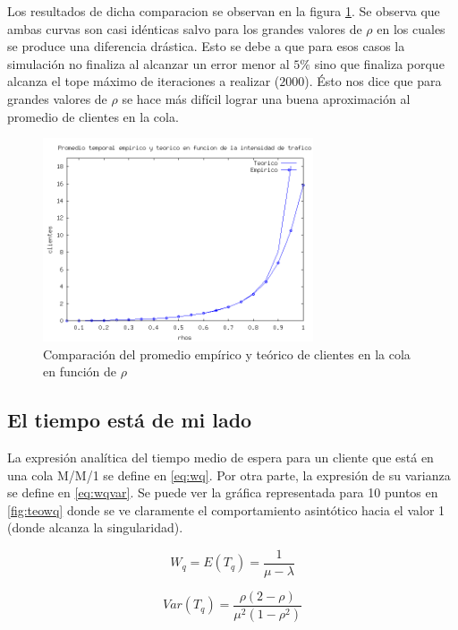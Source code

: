 \documentclass{sig-alternate}
\begin{document}
Los resultados de dicha comparacion se observan en la figura \ref{fig:meanQueueVS}. Se observa que ambas curvas
son casi id\'enticas salvo para los grandes valores de $\rho$ en los cuales se produce una diferencia dr\'astica.
Esto se debe a que para esos casos la simulaci\'on no finaliza al alcanzar un error menor al $5\%$ sino que finaliza
porque alcanza el tope m\'aximo de iteraciones a realizar ($2000$). \'Esto nos dice que para grandes valores de $\rho$
se hace m\'as dif\'icil lograr una buena aproximaci\'on al promedio de clientes en la cola.

\begin{figure}[ht]
\begin{center}
\includegraphics[width=8cm]{teoricoVSempirico}
\caption{\label{fig:meanQueueVS} Comparaci\'on del promedio emp\'irico y te\'orico de clientes en la cola en funci\'on de $\rho$}
\end{center}
\end{figure}

\newpage


\subsection{El tiempo est\'a de mi lado}
\label{sec:parte2}

La expresi\'on anal\'itica del tiempo medio de espera para un cliente que est\'a en una cola M/M/1 se define en \eqref{eq:wq}.
Por otra parte, la expresi\'on de su varianza se define en \eqref{eq:wqvar}.
Se puede ver la gr\'afica representada para 10 puntos en \ref{fig:teowq} donde
se ve claramente el comportamiento asint\'otico hacia el valor 1 (donde alcanza la singularidad).

\begin{equation}
\label{eq:wq}
  W_q = E (T_q)= \frac{1}{\mu-\lambda}
\end{equation}

\begin{equation}
\label{eq:wqvar}
  Var(T_q) = \frac{\rho(2-\rho)}{\mu^2(1-\rho^2)}
\end{equation}
\end{document}
